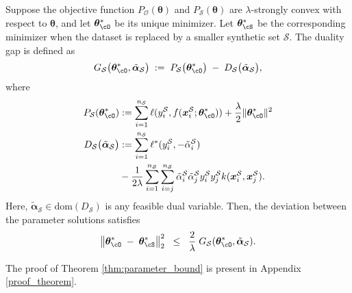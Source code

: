 \begin{theorem}
\label{thm:parameter_bound}
Suppose the objective function $P_{\mathcal{O}}(\boldsymbol{\theta})$ and $P_{\mathcal{S}}(\boldsymbol{\theta})$ are $\lambda$-strongly convex with respect to $\boldsymbol{\theta}$, and let $\bm \theta_{\cO}^*$ be its unique minimizer. Let $\bm \theta_{\cS}^*$ be the corresponding minimizer when the dataset is replaced by a smaller synthetic set $\mathcal{S}$. 
The duality gap is defined as
\[
  G_{\mathcal{S}}\bigl(\bm \theta_{\cO}^*, \tilde{\boldsymbol{\alpha}}_{\mathcal{S}}\bigr)
  \;:=\;
  P_{\mathcal{S}}\bigl(\boldsymbol{\theta}_{\cO}^*\bigr)
  \;-\;
D_{\mathcal{S}}\bigl(\tilde{\boldsymbol{\alpha}}_{\mathcal{S}}\bigr),
\]
where
\begin{equation*}
   \begin{aligned}
    P_\mathcal{S}(\bm \theta_{\cO}^*)&:= \sum_{i=1}^{n_\mathcal{S}} \ell(y_i^\mathcal{S}, f (\boldsymbol{x}_i^\mathcal{S};  \bm \theta_{\cO}^*))+\frac{\lambda}{2}\|\bm \theta_{\cO}^*\|^2  \\
D_{\mathcal{S}}\bigl(\tilde{\boldsymbol{\alpha}}_{\mathcal{S}}\bigr)&:= \sum_{i=1}^{n_\mathcal{S}} \ell^*(y_i^\mathcal{S}, -\tilde{\alpha}_i^\mathcal{S})\\
&- \frac{1}{2\lambda}\sum_{i=1}^{n_\mathcal{S}} \sum_{i=j}^{n_\mathcal{S}}\tilde{\alpha}_i^\mathcal{S}\tilde{\alpha}_j^\mathcal{S} y_i^\mathcal{S} y_j^\mathcal{S} k (\boldsymbol{x}_i^\mathcal{S},\boldsymbol{x}_j^\mathcal{S}).
    \end{aligned}
\end{equation*}
Here, $\tilde{\boldsymbol{\alpha}}_{\mathcal{S}} \in \mathrm{dom}(D_{\mathcal{S}})$ is any feasible dual variable. Then, the deviation between the parameter solutions satisfies
\begin{equation}
      \bigl\|\bm \theta_{\cO}^* \;-\; \bm \theta_{\cS}^*\bigr\|_2^2
  \;\;\le\;\;
  \frac{2}{\lambda}\;
  G_{\mathcal{S}}(\bm \theta_{\cO}^*, \tilde{\boldsymbol{\alpha}}_{\mathcal{S}}).
\label{eq:dualitygap} 
\end{equation}

\end{theorem}
The proof of Theorem \ref{thm:parameter_bound} is present in Appendix \ref{proof_theorem}.



